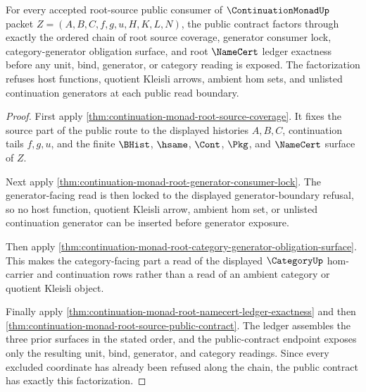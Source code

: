 \begin{theorem}
\label{thm:continuation-monad-root-public-contract-factorization}
For every accepted root-source public consumer of $\ContinuationMonadUp$ packet $Z=(A,B,C,f,g,u,H,K,L,N)$, the public contract factors through exactly the ordered chain of root source coverage, generator consumer lock, category-generator obligation surface, and root $\NameCert$ ledger exactness before any unit, bind, generator, or category reading is exposed. The factorization refuses host functions, quotient Kleisli arrows, ambient hom sets, and unlisted continuation generators at each public read boundary.
\end{theorem}
\begin{proof}
First apply \autoref{thm:continuation-monad-root-source-coverage}. It fixes the source part of the public route to the displayed histories $A,B,C$, continuation tails $f,g,u$, and the finite $\BHist$, $\hsame$, $\Cont$, $\Pkg$, and $\NameCert$ surface of $Z$.

Next apply \autoref{thm:continuation-monad-root-generator-consumer-lock}. The generator-facing read is then locked to the displayed generator-boundary refusal, so no host function, quotient Kleisli arrow, ambient hom set, or unlisted continuation generator can be inserted before generator exposure.

Then apply \autoref{thm:continuation-monad-root-category-generator-obligation-surface}. This makes the category-facing part a read of the displayed $\CategoryUp$ hom-carrier and continuation rows rather than a read of an ambient category or quotient Kleisli object.

Finally apply \autoref{thm:continuation-monad-root-namecert-ledger-exactness} and then \autoref{thm:continuation-monad-root-source-public-contract}. The ledger assembles the three prior surfaces in the stated order, and the public-contract endpoint exposes only the resulting unit, bind, generator, and category readings. Since every excluded coordinate has already been refused along the chain, the public contract has exactly this factorization.
\end{proof}

